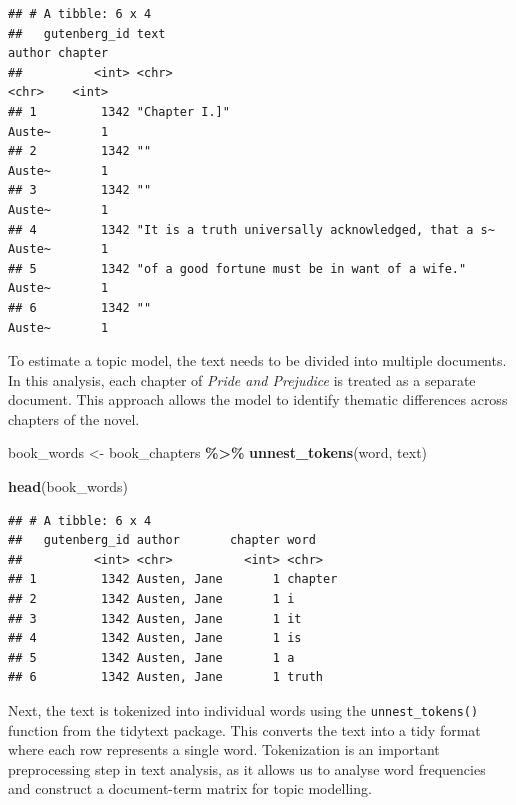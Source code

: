 \documentclass[
]{article}
\newenvironment{Shaded}{\begin{snugshade}}{\end{snugshade}}
\newcommand{\FunctionTok}[1]{\textcolor[rgb]{0.13,0.29,0.53}{\textbf{#1}}}
\newcommand{\NormalTok}[1]{#1}
\newcommand{\OtherTok}[1]{\textcolor[rgb]{0.56,0.35,0.01}{#1}}
\newcommand{\SpecialCharTok}[1]{\textcolor[rgb]{0.81,0.36,0.00}{\textbf{#1}}}
\begin{document}
\begin{verbatim}
## # A tibble: 6 x 4
##   gutenberg_id text                                               author chapter
##          <int> <chr>                                              <chr>    <int>
## 1         1342 "Chapter I.]"                                      Auste~       1
## 2         1342 ""                                                 Auste~       1
## 3         1342 ""                                                 Auste~       1
## 4         1342 "It is a truth universally acknowledged, that a s~ Auste~       1
## 5         1342 "of a good fortune must be in want of a wife."     Auste~       1
## 6         1342 ""                                                 Auste~       1
\end{verbatim}

To estimate a topic model, the text needs to be divided into multiple
documents. In this analysis, each chapter of \emph{Pride and Prejudice}
is treated as a separate document. This approach allows the model to
identify thematic differences across chapters of the novel.

\begin{Shaded}
\begin{Highlighting}[]
\NormalTok{book\_words }\OtherTok{\textless{}{-}}\NormalTok{ book\_chapters }\SpecialCharTok{\%\textgreater{}\%}
  \FunctionTok{unnest\_tokens}\NormalTok{(word, text)}

\FunctionTok{head}\NormalTok{(book\_words)}
\end{Highlighting}
\end{Shaded}

\begin{verbatim}
## # A tibble: 6 x 4
##   gutenberg_id author       chapter word   
##          <int> <chr>          <int> <chr>  
## 1         1342 Austen, Jane       1 chapter
## 2         1342 Austen, Jane       1 i      
## 3         1342 Austen, Jane       1 it     
## 4         1342 Austen, Jane       1 is     
## 5         1342 Austen, Jane       1 a      
## 6         1342 Austen, Jane       1 truth
\end{verbatim}

Next, the text is tokenized into individual words using the
\texttt{unnest\_tokens()} function from the tidytext package. This
converts the text into a tidy format where each row represents a single
word. Tokenization is an important preprocessing step in text analysis,
as it allows us to analyse word frequencies and construct a
document-term matrix for topic modelling.
\end{document}
